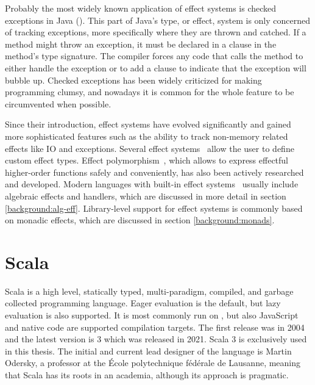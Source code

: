 Probably the most widely known application of effect systems is checked exceptions in Java (). This part of Java's type, or effect, system is only concerned of tracking exceptions, more specifically where they are thrown and catched. If a method might throw an exception, it must be declared in a  clause in the method's type signature. The compiler forces any code that calls the method to either handle the exception or to add a  clause to indicate that the exception will bubble up. Checked exceptions has been widely criticized for making programming clumsy, and nowadays it is common for the whole feature to be circumvented when possible.



Since their introduction, effect systems have evolved significantly and gained more sophisticated features such as the ability to track non-memory related effects like IO and exceptions. Several effect systems~\cite{koka-lang, frank-lang} allow the user to define custom effect types. Effect polymorphism~\cite{polymorphic-alg-effs}, which allows to express effectful higher-order functions safely and conveniently, has also been actively researched and developed. Modern languages with built-in effect systems~\cite{unison-lang, ocaml-lang} usually include algebraic effects and handlers, which are discussed in more detail in section \ref{background:alg-eff}. Library-level support for effect systems is commonly based on monadic effects, which are discussed in section \ref{background:monads}.





\section{Scala} \label{background:scala}
Scala is a high level, statically typed, multi-paradigm, compiled, and garbage collected programming language. Eager evaluation is the default, but lazy evaluation is also supported. It is most commonly run on , but also JavaScript and native code are supported compilation targets. The first release was in 2004 and the latest version is 3 which was released in 2021. Scala 3 is exclusively used in this thesis. The initial and current lead designer of the language is Martin Odersky, a professor at the École polytechnique fédérale de Lausanne, meaning that Scala has its roots in an academia, although its approach is pragmatic.

